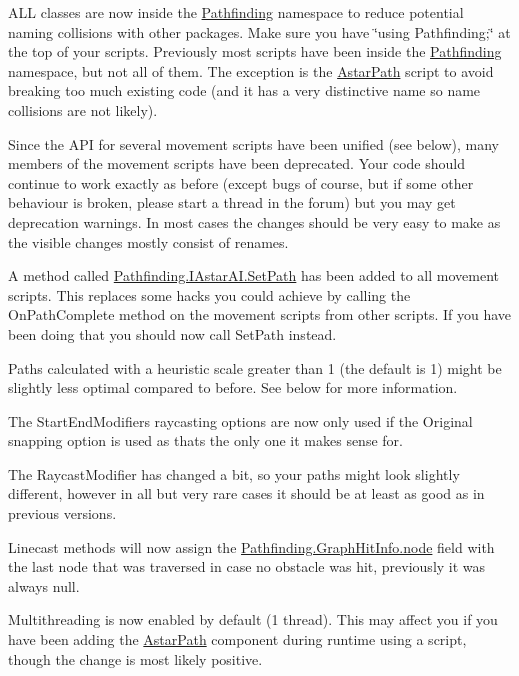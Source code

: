 \begin{DoxyItemize}
\begin{DoxyItemize}
\begin{DoxyItemize}
\item A\+LL classes are now inside the \mbox{\hyperlink{namespace_pathfinding}{Pathfinding}} namespace to reduce potential naming collisions with other packages. Make sure you have \char`\"{}using Pathfinding;\char`\"{} at the top of your scripts. Previously most scripts have been inside the \mbox{\hyperlink{namespace_pathfinding}{Pathfinding}} namespace, but not all of them. The exception is the \mbox{\hyperlink{class_astar_path}{Astar\+Path}} script to avoid breaking too much existing code (and it has a very distinctive name so name collisions are not likely).
\item Since the A\+PI for several movement scripts have been unified (see below), many members of the movement scripts have been deprecated. Your code should continue to work exactly as before (except bugs of course, but if some other behaviour is broken, please start a thread in the forum) but you may get deprecation warnings. In most cases the changes should be very easy to make as the visible changes mostly consist of renames.
\item A method called \mbox{\hyperlink{interface_pathfinding_1_1_i_astar_a_i_a86eb322f611af919dad08b78e580edf4}{Pathfinding.\+I\+Astar\+A\+I.\+Set\+Path}} has been added to all movement scripts. This replaces some hacks you could achieve by calling the On\+Path\+Complete method on the movement scripts from other scripts. If you have been doing that you should now call Set\+Path instead.
\item Paths calculated with a heuristic scale greater than 1 (the default is 1) might be slightly less optimal compared to before. See below for more information.
\item The Start\+End\+Modifier\textquotesingle{}s raycasting options are now only used if the \textquotesingle{}Original\textquotesingle{} snapping option is used as that\textquotesingle{}s the only one it makes sense for.
\item The Raycast\+Modifier has changed a bit, so your paths might look slightly different, however in all but very rare cases it should be at least as good as in previous versions.
\item Linecast methods will now assign the \mbox{\hyperlink{struct_pathfinding_1_1_graph_hit_info_abc12c1ed171ac07da6cd39a06e44e02a}{Pathfinding.\+Graph\+Hit\+Info.\+node}} field with the last node that was traversed in case no obstacle was hit, previously it was always null.
\item Multithreading is now enabled by default (1 thread). This may affect you if you have been adding the \mbox{\hyperlink{class_astar_path}{Astar\+Path}} component during runtime using a script, though the change is most likely positive.

\end{DoxyItemize}
\end{DoxyItemize}
\end{DoxyItemize}
